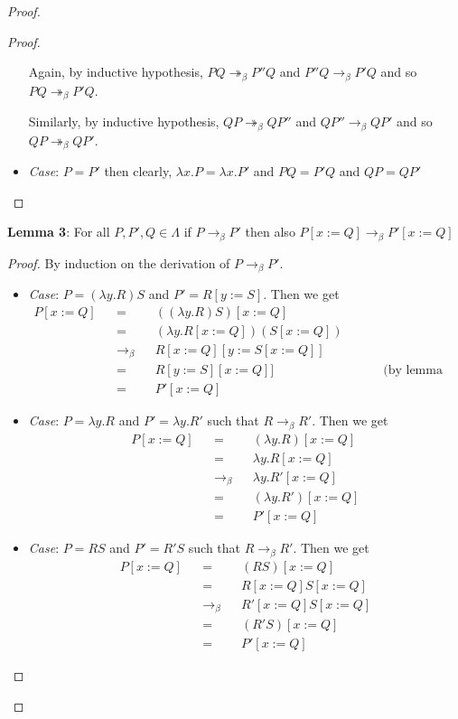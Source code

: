 \documentclass[12pt]{article}
\begin{document}
\begin{proof}
\begin{proof}
\begin{itemize}
Again, by inductive hypothesis, $P Q \twoheadrightarrow_{\beta} P'' Q$ and $P'' Q \rightarrow_{\beta} P' Q$ and so $P Q \twoheadrightarrow_{\beta} P' Q$.

Similarly, by inductive hypothesis, $Q P \twoheadrightarrow_{\beta} Q P''$ and $Q P'' \rightarrow_{\beta} Q P'$ and so $Q P \twoheadrightarrow_{\beta} Q P'$.

\item \textsl{Case}: $P = P'$ then clearly, $\lambda x.P = \lambda x.P'$  and $P Q = P' Q$ and $Q P = Q P'$ \\
\end{itemize}
\end{proof}

\textbf{Lemma 3}: For all $P, P', Q \in \Lambda$ if $P \rightarrow_{\beta} P'$ then also $P[x:=Q] \rightarrow_{\beta} P'[x:=Q]$
\begin{proof}
By induction on the derivation of $P \rightarrow_{\beta} P'$.
\begin{itemize}
\item \textsl{Case}: $P = (\lambda y. R) S$ and $P' = R[y:=S]$. Then we get
\begin{align*}
    P[x:=Q] &&=&& ((\lambda y. R) S)[x:=Q] \\
    &&=&& (\lambda y. R[x:=Q]) (S[x:=Q]) \\
    &&\rightarrow_\beta&& R[x:=Q][y:=S[x:=Q]] \\
    &&=&& R[y:=S][x:=Q]] &&&& \text{(by lemma 1)}\\
    &&=&& P'[x:=Q]
\end{align*}

\item \textsl{Case}: $P = \lambda y. R$ and $P' = \lambda y. R'$ such that $R \rightarrow_\beta R'$. Then we get
\begin{align*}
    P[x:=Q] &&=&& (\lambda y. R)[x:=Q] \\
    &&=&& \lambda y. R[x:=Q] \\
    &&\rightarrow_\beta&& \lambda y. R'[x:=Q] \\
    &&=&& (\lambda y. R')[x:=Q] \\
    &&=&& P'[x:=Q]
\end{align*}

\item \textsl{Case}: $P = R S$ and $P' = R' S$ such that $R \rightarrow_\beta R'$. Then we get
\begin{align*}
    P[x:=Q] &&=&& (R S)[x:=Q] \\
    &&=&& R[x:=Q] S[x:=Q] \\
    &&\rightarrow_\beta&& R'[x:=Q] S[x:=Q] \\
    &&=&& (R' S)[x:=Q] \\
    &&=&& P'[x:=Q]
\end{align*}


\end{itemize}
\end{proof}
\end{proof}
\end{document}
